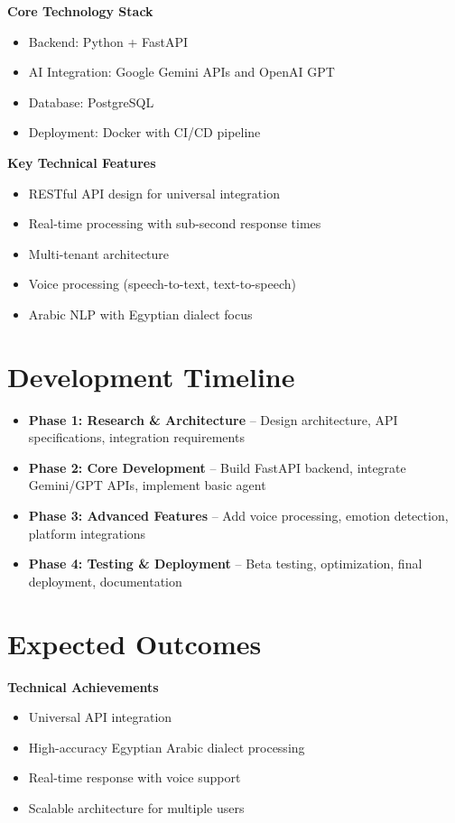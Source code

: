 \documentclass[12pt,a4paper]{article}
\begin{document}
\textbf{Core Technology Stack}
\begin{itemize}
    \item Backend: Python + FastAPI
    \item AI Integration: Google Gemini APIs and OpenAI GPT
    \item Database: PostgreSQL
    \item Deployment: Docker with CI/CD pipeline
\end{itemize}

\textbf{Key Technical Features}
\begin{itemize}
    \item RESTful API design for universal integration
    \item Real-time processing with sub-second response times
    \item Multi-tenant architecture
    \item Voice processing (speech-to-text, text-to-speech)
    \item Arabic NLP with Egyptian dialect focus
\end{itemize}

\section*{Development Timeline}
\begin{itemize}
    \item \textbf{Phase 1: Research \& Architecture} – Design architecture, API specifications, integration requirements
    \item \textbf{Phase 2: Core Development} – Build FastAPI backend, integrate Gemini/GPT APIs, implement basic agent
    \item \textbf{Phase 3: Advanced Features } – Add voice processing, emotion detection, platform integrations
    \item \textbf{Phase 4: Testing \& Deployment} – Beta testing, optimization, final deployment, documentation
\end{itemize}

\section*{Expected Outcomes}
\textbf{Technical Achievements}
\begin{itemize}
    \item Universal API integration
    \item High-accuracy Egyptian Arabic dialect processing
    \item Real-time response with voice support
    \item Scalable architecture for multiple users
\end{itemize}
\end{document}
